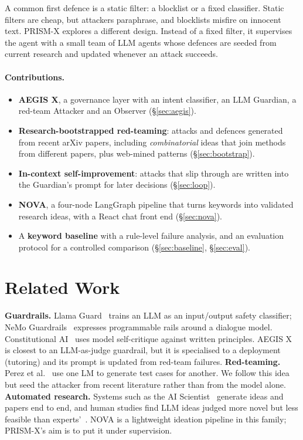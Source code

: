 \documentclass[10pt,twocolumn]{article}
\begin{document}
A common first defence is a static filter: a blocklist or a fixed classifier. Static filters are cheap, but attackers paraphrase, and blocklists misfire on innocent text. PRISM-X explores a different design. Instead of a fixed filter, it supervises the agent with a small team of LLM agents whose defences are seeded from current research and updated whenever an attack succeeds.

\paragraph{Contributions.}
\begin{itemize}
  \item \textbf{AEGIS X}, a governance layer with an intent classifier, an LLM Guardian, a red-team Attacker and an Observer (\S\ref{sec:aegis}).
  \item \textbf{Research-bootstrapped red-teaming}: attacks and defences generated from recent arXiv papers, including \emph{combinatorial} ideas that join methods from different papers, plus web-mined patterns (\S\ref{sec:bootstrap}).
  \item \textbf{In-context self-improvement}: attacks that slip through are written into the Guardian's prompt for later decisions (\S\ref{sec:loop}).
  \item \textbf{NOVA}, a four-node LangGraph pipeline that turns keywords into validated research ideas, with a React chat front end (\S\ref{sec:nova}).
  \item A \textbf{keyword baseline} with a rule-level failure analysis, and an evaluation protocol for a controlled comparison (\S\ref{sec:baseline}, \S\ref{sec:eval}).
\end{itemize}

\section{Related Work}
\textbf{Guardrails.} Llama Guard~\cite{inan2023llamaguard} trains an LLM as an input/output safety classifier; NeMo Guardrails~\cite{rebedea2023nemo} expresses programmable rails around a dialogue model. Constitutional AI~\cite{bai2022constitutional} uses model self-critique against written principles. AEGIS X is closest to an LLM-as-judge guardrail, but it is specialised to a deployment (tutoring) and its prompt is updated from red-team failures.
\textbf{Red-teaming.} Perez et al.~\cite{perez2022redteaming} use one LM to generate test cases for another. We follow this idea but seed the attacker from recent literature rather than from the model alone.
\textbf{Automated research.} Systems such as the AI Scientist~\cite{lu2024aiscientist} generate ideas and papers end to end, and human studies find LLM ideas judged more novel but less feasible than experts'~\cite{si2024novel}. NOVA is a lightweight ideation pipeline in this family; PRISM-X's aim is to put it under supervision.
\end{document}
